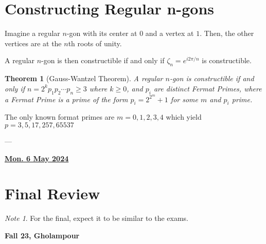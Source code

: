 \documentclass[12pt]{article}
\renewcommand{\date}[1]{\underline{\bf #1}}
\newtheorem{theorem}{Theorem}
\theoremstyle{remark}
\theoremstyle{remark}
\theoremstyle{remark}
\theoremstyle{remark}
\theoremstyle{remark}
\newtheorem*{note}{Note}
\begin{document}
\section{Constructing Regular n-gons}

Imagine a regular $n$-gon with its center at $0$ and a vertex at $1$. Then, the
other vertices are at the $n$th roots of unity.

A regular $n$-gon is then constructible if and only if $\zeta_n = e^{i 2 \pi /
n}$ is constructible.

\begin{theorem}[Gauss-Wantzel Theorem]
  A regular $n$-gon is constructible if and only if $n = 2^k p_1 p_2 \cdots p_n
  \ge 3$ where $k \ge 0$, and $p_i$ are distinct Fermat Primes, where a Fermat
  Prime is a prime of the form $p_i = 2^{2^m} + 1$ for some $m$ and $p_i$ prime.
\end{theorem}

The only known format primes are $m = 0, 1, 2, 3, 4$ which yield $p = 3, 5, 17,
257, 65537$

---

\date{Mon. 6 May 2024}

\section{Final Review}

\begin{note}
  For the final, expect it to be similar to the exams.
\end{note}

{\bf Fall 23, Gholampour}
\end{document}

